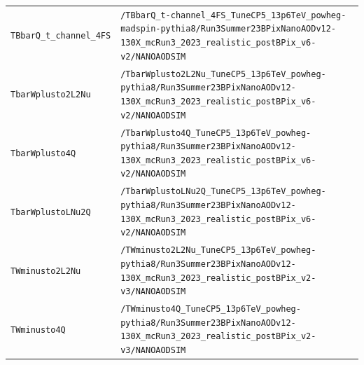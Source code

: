 \begin{longtable}{@{}>{\RaggedRight\arraybackslash}p{} >{\RaggedRight\arraybackslash}p{}@{}}
\addlinespace[2pt]
\texttt{TBbarQ\_\allowbreak{}t\_\allowbreak{}channel\_\allowbreak{}4FS} & \texttt{/\allowbreak{}TBbarQ\_\allowbreak{}t-\allowbreak{}channel\_\allowbreak{}4FS\_\allowbreak{}TuneCP5\_\allowbreak{}13p6TeV\_\allowbreak{}powheg-\allowbreak{}madspin-\allowbreak{}pythia8/\allowbreak{}Run3Summer23BPixNanoAODv12-\allowbreak{}130X\_\allowbreak{}mcRun3\_\allowbreak{}2023\_\allowbreak{}realistic\_\allowbreak{}postBPix\_\allowbreak{}v6-\allowbreak{}v2/\allowbreak{}NANOAODSIM} \\
\addlinespace[2pt]
\texttt{TbarWplusto2L2Nu} & \texttt{/\allowbreak{}TbarWplusto2L2Nu\_\allowbreak{}TuneCP5\_\allowbreak{}13p6TeV\_\allowbreak{}powheg-\allowbreak{}pythia8/\allowbreak{}Run3Summer23BPixNanoAODv12-\allowbreak{}130X\_\allowbreak{}mcRun3\_\allowbreak{}2023\_\allowbreak{}realistic\_\allowbreak{}postBPix\_\allowbreak{}v6-\allowbreak{}v2/\allowbreak{}NANOAODSIM} \\
\addlinespace[2pt]
\texttt{TbarWplusto4Q} & \texttt{/\allowbreak{}TbarWplusto4Q\_\allowbreak{}TuneCP5\_\allowbreak{}13p6TeV\_\allowbreak{}powheg-\allowbreak{}pythia8/\allowbreak{}Run3Summer23BPixNanoAODv12-\allowbreak{}130X\_\allowbreak{}mcRun3\_\allowbreak{}2023\_\allowbreak{}realistic\_\allowbreak{}postBPix\_\allowbreak{}v6-\allowbreak{}v2/\allowbreak{}NANOAODSIM} \\
\addlinespace[2pt]
\texttt{TbarWplustoLNu2Q} & \texttt{/\allowbreak{}TbarWplustoLNu2Q\_\allowbreak{}TuneCP5\_\allowbreak{}13p6TeV\_\allowbreak{}powheg-\allowbreak{}pythia8/\allowbreak{}Run3Summer23BPixNanoAODv12-\allowbreak{}130X\_\allowbreak{}mcRun3\_\allowbreak{}2023\_\allowbreak{}realistic\_\allowbreak{}postBPix\_\allowbreak{}v6-\allowbreak{}v2/\allowbreak{}NANOAODSIM} \\
\addlinespace[2pt]
\texttt{TWminusto2L2Nu} & \texttt{/\allowbreak{}TWminusto2L2Nu\_\allowbreak{}TuneCP5\_\allowbreak{}13p6TeV\_\allowbreak{}powheg-\allowbreak{}pythia8/\allowbreak{}Run3Summer23BPixNanoAODv12-\allowbreak{}130X\_\allowbreak{}mcRun3\_\allowbreak{}2023\_\allowbreak{}realistic\_\allowbreak{}postBPix\_\allowbreak{}v2-\allowbreak{}v3/\allowbreak{}NANOAODSIM} \\
\addlinespace[2pt]
\texttt{TWminusto4Q} & \texttt{/\allowbreak{}TWminusto4Q\_\allowbreak{}TuneCP5\_\allowbreak{}13p6TeV\_\allowbreak{}powheg-\allowbreak{}pythia8/\allowbreak{}Run3Summer23BPixNanoAODv12-\allowbreak{}130X\_\allowbreak{}mcRun3\_\allowbreak{}2023\_\allowbreak{}realistic\_\allowbreak{}postBPix\_\allowbreak{}v2-\allowbreak{}v3/\allowbreak{}NANOAODSIM} \\

\end{longtable}
